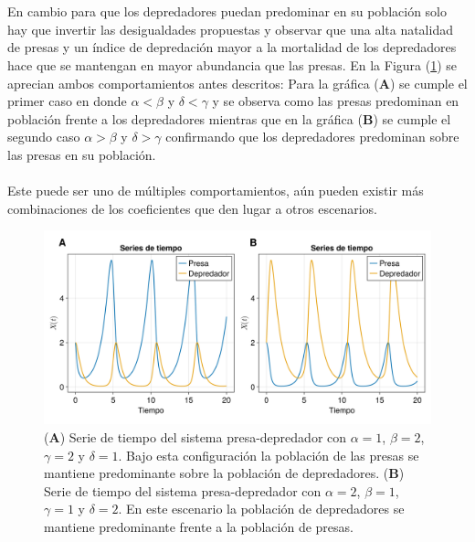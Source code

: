 \\
\\
En cambio para que los depredadores puedan predominar en su población solo hay que invertir las desigualdades propuestas y observar que una alta natalidad de presas y un índice de depredación mayor a la mortalidad de los depredadores hace que se mantengan en mayor abundancia que las presas. En la Figura (\ref{fig:SeriesdeTiempoPD}) se aprecian ambos comportamientos antes descritos: Para la gráfica (\textbf{A}) se cumple el primer caso en donde $\alpha<\beta$ y $\delta<\gamma$ y se observa como las presas predominan en población frente a los depredadores mientras que en la gráfica (\textbf{B}) se cumple el segundo caso $\alpha>\beta$ y $\delta>\gamma$ confirmando que los depredadores predominan sobre las presas en su población. \\
\\
Este puede ser uno de múltiples comportamientos, aún pueden existir más combinaciones de los coeficientes que den lugar a otros escenarios. 
\begin{figure}[h!]
	\centering
	\includegraphics[scale=0.23]{../Imagenes/Series de Tiempo PD}
	\caption{(\textbf{A}) Serie de tiempo del sistema presa-depredador con $\alpha=1$, $\beta=2$, $\gamma=2$ y $\delta=1$. Bajo esta configuración la población de las presas se mantiene predominante sobre la población de depredadores. (\textbf{B}) Serie de tiempo del sistema presa-depredador con $\alpha=2$, $\beta = 1$, $\gamma = 1$ y $\delta = 2$. En este escenario la población de depredadores se mantiene predominante frente a la población de presas.}
	\label{fig:SeriesdeTiempoPD}
\end{figure}

